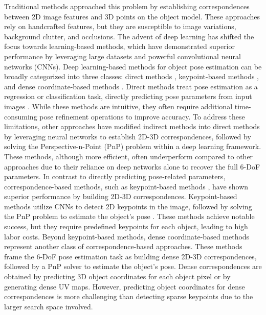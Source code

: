 Traditional methods \cite{lowe1999object, lepetit2005monocular} approached this problem by establishing correspondences between 2D image features and 3D points on the object model. These approaches rely on handcrafted features, but they are susceptible to image variations, background clutter, and occlusions. The advent of deep learning has shifted the focus towards learning-based methods, which have demonstrated superior performance by leveraging large datasets and powerful convolutional neural networks (CNNs). Deep learning-based methods for object pose estimation can be broadly categorized into three classes: direct methods \cite{xiang2017posecnn, kehl2017ssd, trabelsi2021pose, wang2021gdr}, keypoint-based methods \cite{rad2017bb8, tekin2018real, oberweger2018making, peng2019pvnet}, and dense coordinate-based methods \cite{li2019cdpn, park2019pix2pose, zakharov2019dpod}. Direct methods treat pose estimation as a regression or classification task, directly predicting pose parameters from input images \cite{xiang2017posecnn, kehl2017ssd, trabelsi2021pose}. While these methods are intuitive, they often require additional time-consuming pose refinement operations to improve accuracy. To address these limitations, other approaches \cite{hu2020single, chen2020end, wang2021gdr} have modified indirect methods into direct methods by leveraging neural networks to establish 2D-3D correspondences, followed by solving the Perspective-n-Point (PnP) problem \cite{lepetit2009ep} within a deep learning framework. These methods, although more efficient, often underperform compared to other approaches due to their reliance on deep networks alone to recover the full 6-DoF parameters. In contrast to directly predicting pose-related parameters, correspondence-based methods, such as keypoint-based methods \cite{rad2017bb8, tekin2018real, oberweger2018making, peng2019pvnet}, have shown superior performance by building 2D-3D correspondences. Keypoint-based methods utilize CNNs to detect 2D keypoints in the image, followed by solving the PnP problem to estimate the object's pose \cite{lepetit2009ep}. These methods achieve notable success, but they require predefined keypoints for each object, leading to high labor costs. Beyond keypoint-based methods, dense coordinate-based methods \cite{li2019cdpn, park2019pix2pose, zakharov2019dpod} represent another class of correspondence-based approaches. These methods frame the 6-DoF pose estimation task as building dense 2D-3D correspondences, followed by a PnP solver to estimate the object's pose. Dense correspondences are obtained by predicting 3D object coordinates for each object pixel or by generating dense UV maps. However, predicting object coordinates for dense correspondences is more challenging than detecting sparse keypoints due to the larger search space involved.

